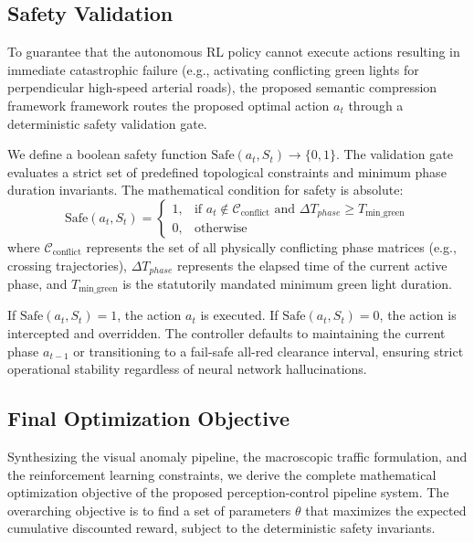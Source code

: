 \documentclass[conference]{IEEEtran}
\begin{document}
\subsection{Safety Validation}
\label{subsec:safety_validation}

To guarantee that the autonomous RL policy cannot execute actions resulting in immediate catastrophic failure (e.g., activating conflicting green lights for perpendicular high-speed arterial roads), the proposed semantic compression framework framework routes the proposed optimal action $a_t$ through a deterministic safety validation gate.

We define a boolean safety function $\text{Safe}(a_t, S_t) \rightarrow \{0, 1\}$. The validation gate evaluates a strict set of predefined topological constraints and minimum phase duration invariants. The mathematical condition for safety is absolute:
\begin{equation}
\text{Safe}(a_t, S_t) = 
\begin{cases} 
1, & \text{if } a_t \notin \mathcal{C}_{\text{conflict}} \text{ and } \Delta T_{phase} \geq T_{\text{min\_green}} \\
0, & \text{otherwise} 
\end{cases}
\label{eq:safety_gate}
\end{equation}
where $\mathcal{C}_{\text{conflict}}$ represents the set of all physically conflicting phase matrices (e.g., crossing trajectories), $\Delta T_{phase}$ represents the elapsed time of the current active phase, and $T_{\text{min\_green}}$ is the statutorily mandated minimum green light duration.

If $\text{Safe}(a_t, S_t) = 1$, the action $a_t$ is executed. If $\text{Safe}(a_t, S_t) = 0$, the action is intercepted and overridden. The controller defaults to maintaining the current phase $a_{t-1}$ or transitioning to a fail-safe all-red clearance interval, ensuring strict operational stability regardless of neural network hallucinations.

\subsection{Final Optimization Objective}
\label{subsec:final_objective}

Synthesizing the visual anomaly pipeline, the macroscopic traffic formulation, and the reinforcement learning constraints, we derive the complete mathematical optimization objective of the proposed perception-control pipeline system. The overarching objective is to find a set of parameters $\theta$ that maximizes the expected cumulative discounted reward, subject to the deterministic safety invariants.
\end{document}
